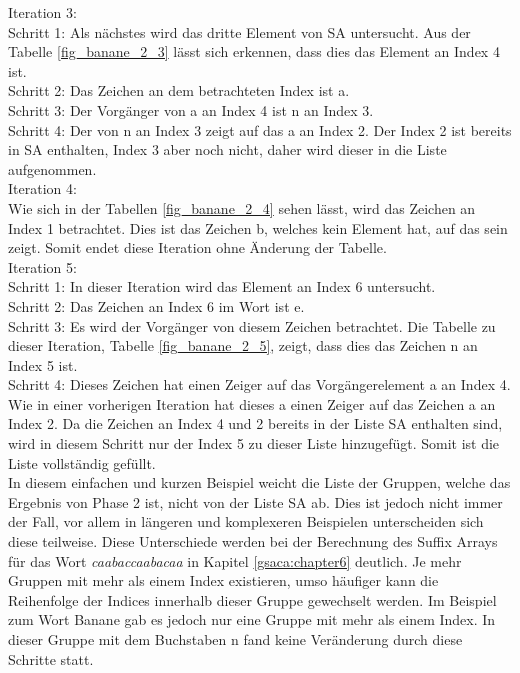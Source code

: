 Iteration 3: \\
Schritt 1: Als nächstes wird das dritte Element von SA untersucht. 
Aus der Tabelle \ref{fig_banane_2_3} lässt sich erkennen, dass dies das Element an Index 4 ist.\\
Schritt 2: Das Zeichen an dem betrachteten Index ist a.\\
Schritt 3: Der Vorgänger von a an Index 4 ist n an Index 3.\\
Schritt 4: Der \prevpointer von n an Index 3 zeigt auf das a an Index 2. 
Der Index 2 ist bereits in SA enthalten, Index 3 aber noch nicht, daher wird dieser in die Liste aufgenommen.\\

Iteration 4: \\
Wie sich in der Tabellen \ref{fig_banane_2_4} sehen lässt, wird das Zeichen an Index 1 betrachtet. 
Dies ist das Zeichen b, welches kein Element hat, auf das sein \prevpointer zeigt. 
Somit endet diese Iteration ohne Änderung der Tabelle.\\

Iteration 5: \\
Schritt 1: In dieser Iteration wird das Element an Index 6 untersucht.\\
Schritt 2: Das Zeichen an Index 6 im Wort ist e.\\
Schritt 3: Es wird der Vorgänger von diesem Zeichen betrachtet. Die Tabelle zu dieser Iteration, Tabelle \ref{fig_banane_2_5}, zeigt, dass dies das Zeichen n an Index 5 ist.\\
Schritt 4: Dieses Zeichen hat einen Zeiger auf das Vorgängerelement a an Index 4. 
Wie in einer vorherigen Iteration hat dieses a einen Zeiger auf das Zeichen a an Index 2. 
Da die Zeichen an Index 4 und 2 bereits in der Liste SA enthalten sind, wird in diesem Schritt nur der Index 5 zu dieser Liste hinzugefügt. 
Somit ist die Liste vollständig gefüllt.\\

In diesem einfachen und kurzen Beispiel weicht die Liste der Gruppen, welche das Ergebnis von Phase 2 ist, nicht von der Liste SA ab.
Dies ist jedoch nicht immer der Fall, vor allem in längeren und komplexeren Beispielen unterscheiden sich diese teilweise. 
Diese Unterschiede werden bei der Berechnung des Suffix Arrays für das Wort \textit{caabaccaabacaa} in Kapitel \ref{gsaca:chapter6} deutlich. 
Je mehr Gruppen mit mehr als einem Index existieren, umso häufiger kann die Reihenfolge der Indices innerhalb dieser Gruppe gewechselt werden. 
Im Beispiel zum Wort Banane gab es jedoch nur eine Gruppe mit mehr als einem Index. 
In dieser Gruppe mit dem Buchstaben n fand keine Veränderung durch diese Schritte statt.\\
\newpage

